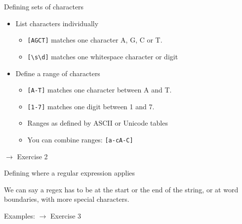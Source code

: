 \documentclass{beamer}
\begin{document}
\begin{frame}{Defining sets of characters}
 \begin{itemize}
  \item List characters individually
    \begin{itemize}
      \item \lstinline$[AGCT]$ matches one character A, G, C or T.
      \item \lstinline$[\s\d]$ matches one whitespace character or digit
    \end{itemize}
  \item Define a range of characters
    \begin{itemize}
      \item \lstinline$[A-T]$ matches one character between A and T.
      \item \lstinline$[1-7]$ matches one digit between 1 and 7.
      \item Ranges as defined by ASCII or Unicode tables
      \item You can combine ranges: \lstinline$[a-cA-C]$
    \end{itemize}
 \end{itemize}

 \bigskip
 $\rightarrow$ Exercise 2

\end{frame}

\begin{frame}{Defining where a regular expression applies}

We can say a regex has to be at the start or the end of the string, or at word boundaries,
with more special characters.


Examples: $\rightarrow$ Exercise 3

\end{frame}
\end{document}

